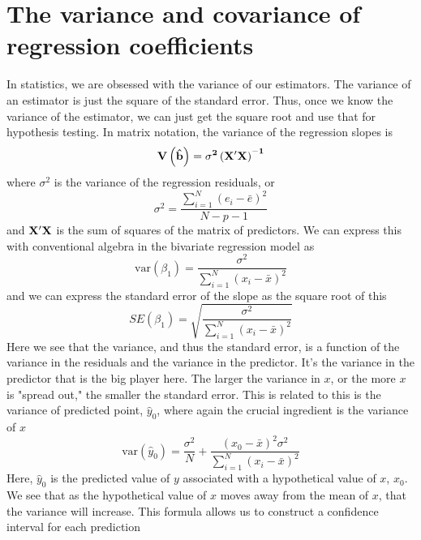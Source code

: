 \section{The variance and covariance of regression coefficients}
\label{sec:matrixv}
In statistics, we are obsessed with the variance of our estimators. The variance of an estimator is just the square of the standard error. Thus, once we know the variance of the estimator, we can just get the square root and use that for hypothesis testing. In matrix notation, the variance of the regression slopes is
\begin{equation}
\bf V\left({\hat{b}}\right)=\sigma^2\left(X'X\right)^{-1}
\end{equation}
where $\sigma^2$ is the variance of the regression residuals, or
\begin{equation}
\sigma^2 = \frac{\sum_{i=1}^N\left(e_i-\bar{e}\right)^2}{N-p-1}
\end{equation}
and $\bf X'X$ is the sum of squares of the matrix of predictors. We can express this with conventional algebra in the bivariate regression model as
\begin{equation}\label{eq:olsb1var}
\mbox{var}\left(\beta_1\right)=\frac{\sigma^2}{\sum_{i=1}^N\left(x_i-\bar{x}\right)^2}
\end{equation}
and we can express the standard error of the slope as the square root of this
\begin{equation}
SE\left(\beta_1\right)=\sqrt{\frac{\sigma^2}{\sum_{i=1}^N\left(x_i-\bar{x}\right)^2}}
\end{equation}
Here we see that the variance, and thus the standard error, is a function of the variance in the residuals and the variance in the predictor. It's the variance in the predictor that is the big player here. The larger the variance in $x$, or the more $x$ is "spread out," the smaller the standard error.
This is related to this is the variance of predicted point, $\hat{y}_0$, where again the crucial ingredient is the variance of $x$
\begin{equation}\label{eq:varfit}
\mbox{var}\left(\hat{y}_0\right)=\frac{\sigma^2}{N}+\frac{\left(x_0-\bar{x}\right)^2\sigma^2}{\sum_{i=1}^N\left(x_i-\bar{x}\right)^2}
\end{equation}
Here, $\hat{y}_0$ is the predicted value of $y$ associated with a hypothetical value of $x$, $x_0$. We see that as the hypothetical value of $x$ moves away from the mean of $x$, that the variance will increase.  This formula allows us to construct a confidence interval for each prediction
